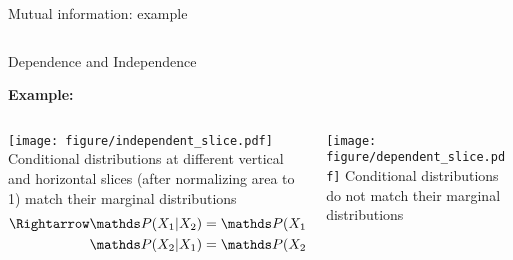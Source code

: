 \documentclass[10pt,compress,t,notes=noshow, xcolor=table]{beamer}
\begin{document}
\begin{frame}{Mutual information: example}
\begin{columns}[c, totalwidth=\textwidth]
\begin{column}{0.74\linewidth}
    \end{column}
\end{columns}



\end{frame}



\begin{frame}{Dependence and Independence}
	
\textbf{Example:}
\begin{columns}[T, totalwidth=\linewidth]
\begin{column}{0.49\linewidth}
\texttt{[image: figure/independent\_slice.pdf]}
Conditional distributions at different vertical and horizontal slices (after normalizing area to 1) match their marginal distributions
\begin{align*}
    \Rightarrow \P(X_1|X_2) &= \P(X_1) \hspace{2.5cm} \\ 
    \P(X_2|X_1) &= \P(X_2)
\end{align*}
\end{column}
\hfill\pause
\begin{column}{0.49\linewidth}
\texttt{[image: figure/dependent\_slice.pdf]}
Conditional distributions do not match their marginal distributions
\end{column}
\end{columns}


\end{frame}
\end{document}
